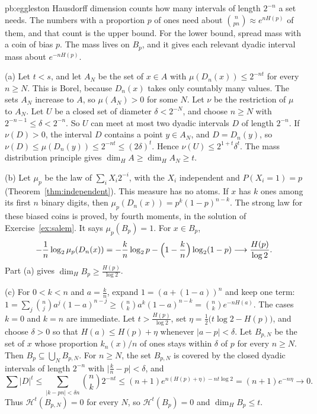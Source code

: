 \begin{solution}{pb:eggleston}
\idea Hausdorff dimension counts how many intervals of length $2^{-n}$ a set needs. The numbers with a proportion $p$ of ones need about $\binom{n}{pn}\approx e^{nH(p)}$ of them, and that count is the upper bound. For the lower bound, spread mass with a coin of bias $p$. The mass lives on $B_p$, and it gives each relevant dyadic interval mass about $e^{-nH(p)}$.

\writeup (a) Let $t<s$, and let $A_N$ be the set of $x\in A$ with $\mu(D_n(x))\le 2^{-nt}$ for every $n\ge N$. This is Borel, because $D_n(x)$ takes only countably many values. The sets $A_N$ increase to $A$, so $\mu(A_N)>0$ for some $N$. Let $\nu$ be the restriction of $\mu$ to $A_N$. Let $U$ be a closed set of diameter $\delta<2^{-N}$, and choose $n\ge N$ with $2^{-n-1}\le\delta<2^{-n}$. So $U$ can meet at most two dyadic intervals $D$ of length $2^{-n}$. If $\nu(D)>0$, the interval $D$ contains a point $y\in A_N$, and $D=D_n(y)$, so $\nu(D)\le\mu(D_n(y))\le 2^{-nt}\le(2\delta)^t$. Hence $\nu(U)\le 2^{1+t}\delta^t$. The mass distribution principle gives $\dim_HA\ge\dim_HA_N\ge t$.

(b) Let $\mu_p$ be the law of $\sum_i X_i 2^{-i}$, with the $X_i$ independent and $P(X_i=1)=p$ (Theorem~\ref{thm:independent}). This measure has no atoms. If $x$ has $k$ ones among its first $n$ binary digits, then $\mu_p(D_n(x))=p^k(1-p)^{n-k}$. The strong law for these biased coins is proved, by fourth moments, in the solution of Exercise~\ref{ex:salem}. It says $\mu_p(B_p)=1$. For $x\in B_p$,
\[
-\frac1n\log_2\mu_p(D_n(x))=-\frac kn\log_2 p-\Bigl(1-\frac kn\Bigr)\log_2(1-p)\longrightarrow\frac{H(p)}{\log 2}.
\]
Part (a) gives $\dim_HB_p\ge\frac{H(p)}{\log 2}$.

(c) For $0<k<n$ and $a=\frac kn$, expand $1=(a+(1-a))^n$ and keep one term: $1=\sum_j\binom nj a^j(1-a)^{n-j}\ge\binom nk a^k(1-a)^{n-k}=\binom nk e^{-nH(a)}$. The cases $k=0$ and $k=n$ are immediate. Let $t>\frac{H(p)}{\log 2}$, set $\eta=\frac12\bigl(t\log 2-H(p)\bigr)$, and choose $\delta>0$ so that $H(a)\le H(p)+\eta$ whenever $|a-p|<\delta$. Let $B_{p,N}$ be the set of $x$ whose proportion $k_n(x)/n$ of ones stays within $\delta$ of $p$ for every $n\ge N$. Then $B_p\subseteq\bigcup_N B_{p,N}$. For $n\ge N$, the set $B_{p,N}$ is covered by the closed dyadic intervals of length $2^{-n}$ with $\bigl|\frac kn-p\bigr|<\delta$, and
\[
\sum|D|^t\le\sum_{|k-pn|<\delta n}\binom nk 2^{-nt}\le(n+1)e^{n(H(p)+\eta)-nt\log 2}=(n+1)e^{-n\eta}\longrightarrow 0.
\]
Thus $\mathcal H^t(B_{p,N})=0$ for every $N$, so $\mathcal H^t(B_p)=0$ and $\dim_HB_p\le t$.


\end{solution}
